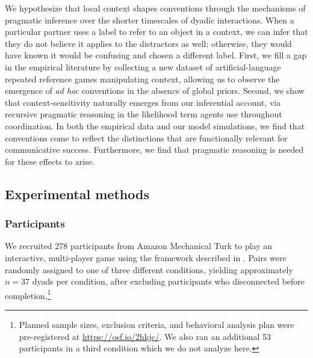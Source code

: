 We hypothesize that local context shapes conventions through the mechanisms of pragmatic inference over the shorter timescales of dyadic interactions.
When a particular partner uses a label to refer to an object in a context, we can infer that they do not believe it applies to the distractors as well; otherwise, they would have known it would be confusing and chosen a different label.
First, we fill a gap in the empirical literature by collecting a new dataset of artificial-language repeated reference games manipulating context, allowing us to observe the emergence of \emph{ad hoc} conventions in the absence of global priors.
Second, we show that context-sensitivity naturally emerges from our inferential account, via recursive pragmatic reasoning in the likelihood term agents use throughout coordination.
In both the empirical data and our model simulations, we find that conventions come to reflect the distinctions that are functionally relevant for communicative success. 
Furthermore, we find that pragmatic reasoning is needed for these effects to arise. 

			
\subsection{Experimental methods}

\subsubsection{Participants}

We recruited 278 participants from Amazon Mechanical Turk to play an interactive, multi-player game using the framework described in . Pairs were randomly assigned to one of three different conditions, yielding approximately $n=37$ dyads per condition, after excluding participants who disconnected before completion.\footnote{Planned sample sizes, exclusion criteria, and behavioral analysis plan were pre-registered at \url{https://osf.io/2hkjc/}. We also ran an additional 53 participants in a third condition which we do not analyze here.}

